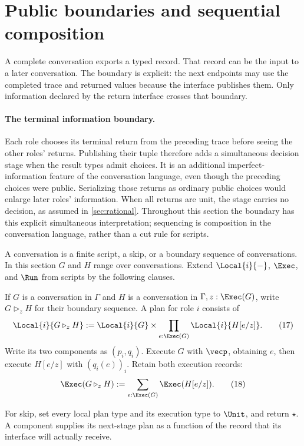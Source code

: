 \section{Public boundaries and sequential composition}
\label{sec:composition}

A complete conversation exports a typed record. That record can be the input
to a later conversation. The boundary is explicit: the next endpoints may use
the completed trace and returned values because the interface publishes them.
Only information declared by the return interface crosses that boundary.

\paragraph{The terminal information boundary.}
Each role chooses its terminal return from the preceding trace before seeing
the other roles' returns. Publishing their tuple therefore adds a simultaneous
decision stage when the result types admit choices. It is an additional
imperfect-information feature of the conversation language, even though the
preceding choices were public. Serializing those returns as ordinary public
choices would enlarge later roles' information. When all returns are unit,
the stage carries no decision, as assumed in \cref{sec:rational}.
Throughout this section the boundary has this
explicit simultaneous interpretation; sequencing is composition in the
conversation language, rather than a cut rule for scripts.

A conversation is a finite script, a skip, or a boundary sequence of
conversations. In this section $G$ and $H$ range over conversations. Extend
$\Local{i}{-}$, $\Exec$, and $\Run$ from scripts by the following clauses.

\begin{definition}
If $G$ is a conversation in $\Gamma$ and
$H$ is a conversation in $\Gamma,z:\Exec(G)$, write $G\mathbin{\triangleright_z}H$
for their boundary sequence. A plan for role $i$ consists of
\[
 \Local{i}{G\mathbin{\triangleright_z}H}
   :=\Local{i}{G}\times\prod_{e:\Exec(G)}\Local{i}{H[e/z]}.
 \tag{17}
\]
Write its two components as $(p_i,q_i)$.
Execute $G$ with $\vecp$, obtaining $e$, then execute $H[e/z]$ with
$(q_i(e))_i$. Retain both execution records:
\[
 \Exec(G\mathbin{\triangleright_z}H)
       :=\sum_{e:\Exec(G)}\Exec(H[e/z]).
 \tag{18}
\]
\end{definition}

For skip, set every local plan type and its execution type to $\Unit$, and
return $\star$. A component supplies its next-stage plan as a function of the
record that its interface will actually receive.

